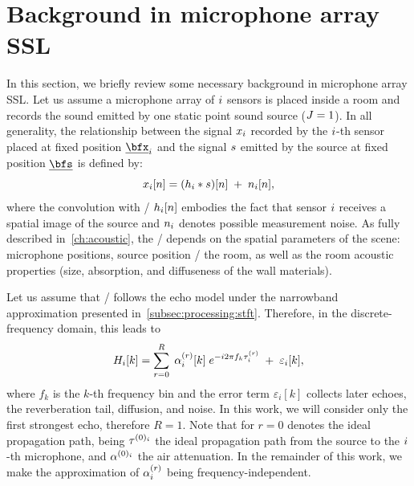 \section{Background in microphone array SSL}\label{sec:background}
In this section, we briefly review some necessary background in microphone array \ac{SSL}.
Let us assume a microphone array of $i$ sensors is placed inside a room and records the sound emitted by one static point sound source ($J=1$).
In all generality, the relationship between the signal $x_{i}$ recorded by the $i$-th sensor placed at fixed position $\positionMicrophone_\idxMic$ and the signal $s$ emitted by the source at fixed position $\positionSource$ is defined by:
\begin{equation}\label{eq:mirage:anymic_time}
x_i[n] = (h_{i} \ast s)[n]  \; + \; n_{i}[n],
\end{equation}
where the convolution with \RIR/ $h_{i}[n]$ embodies the fact that sensor $i$ receives a spatial image of the source and $n_{i}$ denotes possible measurement noise.
As fully described in~\cref{ch:acoustic}, the \RIR/ depends on the spatial parameters of the scene: microphone positions, source position \wrt/ the room, as well as the room acoustic properties (size, absorption, and diffuseness of the wall materials).

\mynewline
Let us assume that \RIRs/ follows the echo model under the narrowband approximation presented in~\cref{subsec:processing:stft}.
Therefore, in the discrete-frequency domain, this leads to
\begin{equation}\label{eq:mirage:rir}
    H_{i}[k] = \sum_{r=0}^{R}  \; \alpha_{i}^{(r)}[k] \; {e}^{- {i} 2 \pi f_k \tau_{i}^{(r)}} \; + \; \varepsilon_{i}[k],
\end{equation}
where $f_k$ is the $k$-th frequency bin and the error term $\varepsilon_i[k]$ collects later echoes, the reverberation tail, diffusion, and noise.
In this work, we will consider only the first strongest echo, therefore $R = 1$.
Note that for $r=0$ denotes the ideal propagation path,
being $\tau^{(0)_{i}}$ the ideal propagation path from the source to the $i$-th microphone, and $\alpha^{(0)_{i}}$ the air attenuation.
In the remainder of this work, we make the approximation of $\alpha_i^{(r)}$ being frequency-independent.

